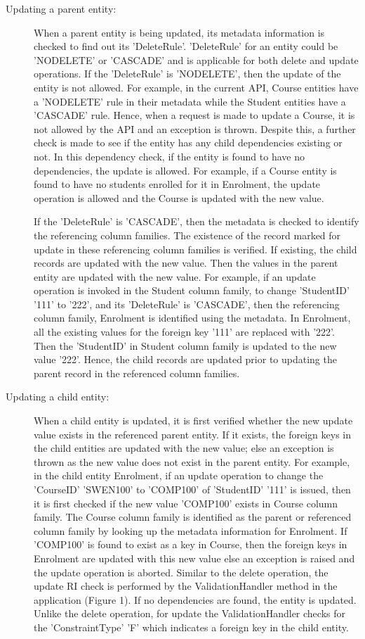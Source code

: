 \begin{description}
\item [Updating a parent entity:] When a parent entity is being updated, its
metadata information is checked to find out its 'DeleteRule'. 'DeleteRule' for an entity
could be 'NODELETE' or 'CASCADE' and is applicable for both delete and update
operations. If the 'DeleteRule' is 'NODELETE', then the update of the entity is
not allowed. For example, in the current API, Course entities have a 'NODELETE'
rule in their metadata while the Student entities have a 'CASCADE' rule. Hence,
when a request is made to update a Course, it is not allowed by the API and an
exception is thrown. Despite this, a further check is made to see if the entity
has any child dependencies existing or not. In this dependency check, if the
entity is found to have no dependencies, the update is allowed.  For example, if
a Course entity is found to have no students enrolled for it in Enrolment, the
update operation is allowed and the Course is updated with the new value.

If the 'DeleteRule' is 'CASCADE', then the metadata is checked to identify the
referencing column families. The existence of the record marked for update in
these referencing column families is verified. If existing, the child records
are updated with the new value. Then the values in the parent entity are updated
with the new value. For example, if an update operation is invoked in the
Student column family, to change 'StudentID' '111' to '222', and its
'DeleteRule' is 'CASCADE', then the referencing column family, Enrolment is
identified using the metadata. In Enrolment, all the existing values for the
foreign key '111' are replaced with '222'. Then the 'StudentID' in Student
column family is updated to the new value '222'. Hence, the child records are
updated prior to updating the parent record in the referenced column families.

\item [Updating a child entity:] When a child entity is updated, it is first
verified whether the new update value exists in the referenced parent entity. If it
exists, the foreign keys in the child entities are updated with the new value;
else an exception is thrown as the new value does not exist in the parent
entity. For example, in the child entity Enrolment, if an update operation to
change the 'CourseID' 'SWEN100' to 'COMP100' of 'StudentID' '111' is issued,
then it is first checked if the new value 'COMP100' exists in Course column
family. The Course column family is identified as the parent or referenced
column family by looking up the metadata information for Enrolment. If 'COMP100'
is found to exist as a key in Course, then the foreign keys in Enrolment are
updated with this new value else an exception is raised and the update operation
is aborted.
Similar to the delete operation, the update RI check is performed by the
ValidationHandler method in the application (Figure 1). If no dependencies are
found, the entity is updated. Unlike the delete operation, for update the
ValidationHandler checks for the 'ConstraintType' 'F' which indicates a foreign
key in the child entity.
\end {description}
